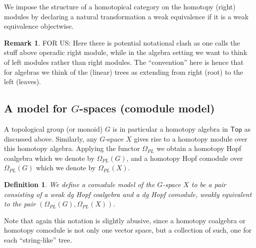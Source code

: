 \documentclass[a4paper]{amsart}
\theoremstyle{plain}
\newtheorem{defi}[thm]{Definition}
\theoremstyle{definition}
\newtheorem{rem}[thm]{Remark}
\renewcommand{\Top}{\mathsf{Top}}
\begin{document}
We impose the structure of a homotopical category on the homotopy (right) modules by declaring a natural transformation a weak equivalence if it is a weak equivalence objectwise.


\begin{rem}
FOR US: Here there is potential notational clash as one calls the stuff above operadic right module, while in the algebra setting we want to think of left modules rather than right modules.
The ``convention'' here is hence that for algebras we think of the (linear) trees as extending from right (root) to the left (leaves).
\end{rem}


% 

\subsection{A model for \texorpdfstring{$G$}{G}-spaces (comodule model)}\label{sec:comodule model}
A topological group (or monoid) $G$ is in particular a homotopy algebra in $\Top$ as discussed above.
Similarly, any $G$-space $X$ gives rise to a homotopy module over this homotopy algebra.
Applying the functor $\Omega_{PL}$ we obtain a homotopy Hopf coalgebra which we denote by $\Omega_{PL}(G)$, and a homotopy Hopf comodule over $\Omega_{PL}(G)$ which we denote by $\Omega_{PL}(X)$.

\begin{defi}
We define a \emph{comodule model} of the $G$-space $X$ to be a pair consisting of a weak dg Hopf coalgebra and a dg Hopf comodule, weakly equivalent to the pair $(\Omega_{PL}(G), \Omega_{PL}(X))$.
\end{defi}
Note that again this notation is slightly abusive, since a homotopy coalgebra or homotopy comodule is not only one vector space, but a collection of such, one for each ``string-like'' tree.
\end{document}

